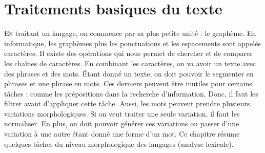 \documentclass{KodeBook}
\begin{document}
		\mainmatter
	
\fi
\chapter{Traitements basiques du texte}

\begin{introduction}
	\lettrine{E}{n} traitant un langage, on commence par sa plus petite unité : le graphème. 
	En informatique, les graphèmes plus les ponctuations et les espacements sont appelés caractères. 
	Il existe des opérations qui nous permet de chercher et de comparer les chaînes de caractères.
	En combinant les caractères, on va avoir un texte avec des phrases et des mots. 
	Étant donné un texte, on doit pouvoir le segmenter en phrases et une phrase en mots. 
	Ces derniers peuvent être inutiles pour certains tâches ; comme les prépositions dans la recherche d'information. 
	Donc, il faut les filtrer avant d'appliquer cette tâche. 
	Aussi, les mots peuvent prendre plusieurs variations morphologiques. 
	Si on veut traiter une seule variation, il faut les normaliser. 
	En plus, on doit pouvoir générer ces variations ou passer d'une variation à une autre étant donné une forme d'un mot. 
	Ce chapitre résume quelques tâches du niveau morphologique des langages (analyse lexicale).
\end{introduction} 
\end{document}
